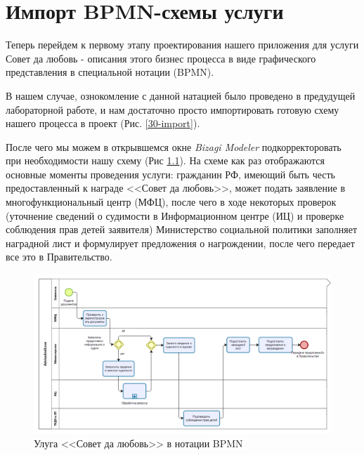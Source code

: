\chapter{Импорт BPMN-схемы услуги}

Теперь перейдем к первому этапу проектирования нашего приложения
для услуги Совет да любовь - описания этого бизнес процесса в виде
графического представления в специальной нотации (BPMN).

В нашем случае, ознокомление с данной натацией было проведено в предудущей
лабораторной работе, и нам достаточно просто импортировать готовую схему
нашего процесса в проект (Рис. \ref{30-import}).


После чего мы можем в открывшемся окне \textit{Bizagi Modeler} подкорректоровать
при необходимости нашу схему (Рис \ref{30-description}). На схеме как раз
отображаются основные моменты проведения услуги: гражданин РФ, имеющий быть
честь предоставленный к награде <<Совет да любовь>>, может подать заявление
в многофункциональный центр (МФЦ), после чего в ходе некоторых проверок
(уточнение сведений о судимости в Информационном центре (ИЦ) и проверке соблюдения
прав детей заявителя) Министерство социальной политики заполняет наградной лист
и формулирует предложения о нагрождении, после чего передает все это в Правительство.

\begin{figure}
    \centering
    \includegraphics[width=\textwidth]{figures/30-BPMN}
    \caption{Улуга <<Совет да любовь>> в нотации BPMN}
    \label{30-description}
\end{figure}